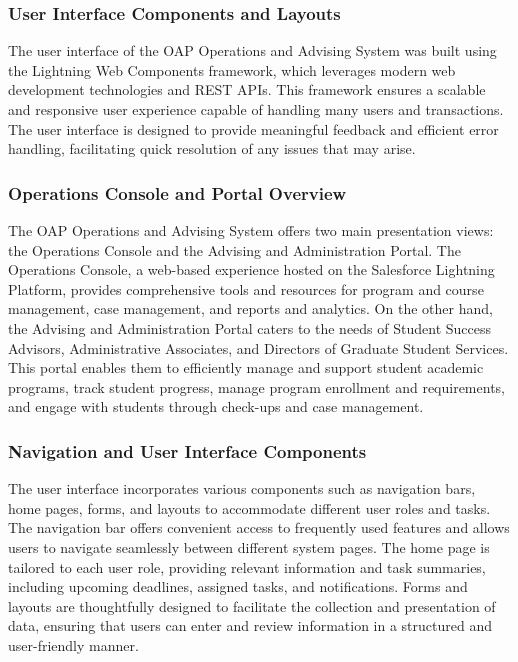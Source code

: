 \documentclass[12pt]{article}
\begin{document}
\subsubsection{User Interface Components and Layouts} 
The user interface of the OAP Operations and Advising System was built using the Lightning Web Components framework, which leverages modern web development technologies and REST APIs. This framework ensures a scalable and responsive user experience capable of handling many users and transactions. The user interface is designed to provide meaningful feedback and efficient error handling, facilitating quick resolution of any issues that may arise.

\subsubsection{Operations Console and Portal Overview} 
The OAP Operations and Advising System offers two main presentation views: the Operations Console and the Advising and Administration Portal. The Operations Console, a web-based experience hosted on the Salesforce Lightning Platform, provides comprehensive tools and resources for program and course management, case management, and reports and analytics. On the other hand, the Advising and Administration Portal caters to the needs of Student Success Advisors, Administrative Associates, and Directors of Graduate Student Services. This portal enables them to efficiently manage and support student academic programs, track student progress, manage program enrollment and requirements, and engage with students through check-ups and case management.

\subsubsection{Navigation and User Interface Components}
The user interface incorporates various components such as navigation bars, home pages, forms, and layouts to accommodate different user roles and tasks. The navigation bar offers convenient access to frequently used features and allows users to navigate seamlessly between different system pages. The home page is tailored to each user role, providing relevant information and task summaries, including upcoming deadlines, assigned tasks, and notifications. Forms and layouts are thoughtfully designed to facilitate the collection and presentation of data, ensuring that users can enter and review information in a structured and user-friendly manner.
\end{document}
